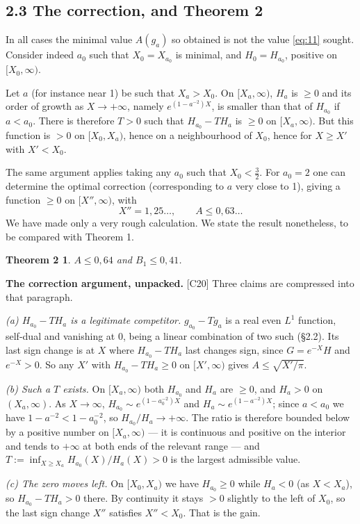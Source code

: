 \documentclass[11pt,reqno]{amsart}
\theoremstyle{plain}
\newtheorem*{thmB}{Theorem 2}
\theoremstyle{definition}
\theoremstyle{remark}
\newcommand{\Ledger}[1]{{\scriptsize\textsf{[#1]}}}
\begin{document}
\subsection*{2.3 The correction, and Theorem 2}

In all cases the minimal value $A(g_a)$ so obtained is not the value \eqref{eq:11}
sought. Consider indeed $a_0$ such that $X_0=X_{a_0}$ is minimal, and $H_0=H_{a_0}$,
positive on $[X_0,\infty)$.

Let $a$ (for instance near 1) be such that $X_a>X_0$. On $[X_a,\infty)$, $H_a$ is
$\ge0$ and its order of growth as $X\to+\infty$, namely $e^{(1-a^{-2})X}$, is smaller
than that of $H_{a_0}$ if $a<a_0$. There is therefore $T>0$ such that
$H_{a_0}-TH_a$ is $\ge0$ on $[X_a,\infty)$. But this function is $>0$ on
$[X_0,X_a)$, hence on a neighbourhood of $X_0$, hence for $X\ge X'$ with $X'<X_0$.

The same argument applies taking any $a_0$ such that $X_0<\tfrac32$. For $a_0=2$ one
can determine the optimal correction (corresponding to $a$ very close to 1), giving a
function $\ge0$ on $[X'',\infty)$, with
\begin{equation}\label{eq:26}
 X''=1{,}25\ldots,\qquad A\le0{,}63\ldots
\end{equation}
We have made only a very rough calculation. We state the result nonetheless, to be
compared with Theorem 1.

\begin{thmB}
$A\le0{,}64$ and $B_1\le0{,}41$.
\end{thmB}

\begin{expansion}
\textbf{The correction argument, unpacked.} \Ledger{C20} Three claims are compressed
into that paragraph.

\emph{(a) $H_{a_0}-TH_a$ is a legitimate competitor.} $g_{a_0}-Tg_a$ is a real even
$L^1$ function, self-dual and vanishing at $0$, being a linear combination of two such
(\S2.2). Its last sign change is at $X$ where $H_{a_0}-TH_a$ last changes sign, since
$G=e^{-X}H$ and $e^{-X}>0$. So any $X'$ with $H_{a_0}-TH_a\ge0$ on $[X',\infty)$
gives $A\le\sqrt{X'/\pi}$.

\emph{(b) Such a $T$ exists.} On $[X_a,\infty)$ both $H_{a_0}$ and $H_a$ are $\ge0$,
and $H_a>0$ on $(X_a,\infty)$. As $X\to\infty$, $H_{a_0}\sim e^{(1-a_0^{-2})X}$ and
$H_a\sim e^{(1-a^{-2})X}$; since $a<a_0$ we have $1-a^{-2}<1-a_0^{-2}$, so
$H_{a_0}/H_a\to+\infty$. The ratio is therefore bounded below by a positive number on
$[X_a,\infty)$ --- it is continuous and positive on the interior and tends to
$+\infty$ at both ends of the relevant range --- and $T:=\inf_{X\ge
X_a}H_{a_0}(X)/H_a(X)>0$ is the largest admissible value.

\emph{(c) The zero moves left.} On $[X_0,X_a)$ we have $H_{a_0}\ge0$ while $H_a<0$
(as $X<X_a$), so $H_{a_0}-TH_a>0$ there. By continuity it stays $>0$ slightly to the
left of $X_0$, so the last sign change $X''$ satisfies $X''<X_0$. That is the gain.
\end{expansion}
\end{document}
